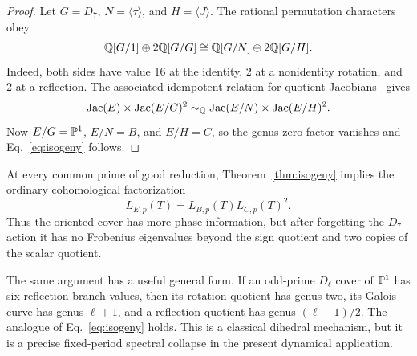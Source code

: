 \begin{proof}
Let $G=D_7$, $N=\langle\tau\rangle$, and $H=\langle J\rangle$.  The rational
permutation characters obey
\begin{equation}\label{eq:brauer}
 \mathbb Q[G/1]\oplus2\mathbb Q[G/G]
 \cong \mathbb Q[G/N]\oplus2\mathbb Q[G/H].
\end{equation}
Indeed, both sides have value 16 at the identity, 2 at a nonidentity rotation,
and 2 at a reflection.  The associated idempotent relation for quotient
Jacobians~\cite{kani1989idempotent} gives
\[
 \operatorname{Jac}(E)\times\operatorname{Jac}(E/G)^2
 \sim_\mathbb Q \operatorname{Jac}(E/N)\times\operatorname{Jac}(E/H)^2.
\]
Now $E/G=\mathbb P^1$, $E/N=B$, and $E/H=C$, so the genus-zero factor vanishes and
Eq.~\eqref{eq:isogeny} follows.
\end{proof}

At every common prime of good reduction, Theorem~\ref{thm:isogeny} implies
the ordinary cohomological factorization
\begin{equation}\label{eq:local-product}
 L_{E,p}(T)=L_{B,p}(T)L_{C,p}(T)^2.
\end{equation}
Thus the oriented cover has more phase information, but after forgetting the
$D_7$ action it has no Frobenius eigenvalues beyond the sign quotient and two
copies of the scalar quotient.

The same argument has a useful general form.  If an odd-prime $D_\ell$ cover
of $\mathbb P^1$ has six reflection branch values, then its rotation quotient has
genus two, its Galois curve has genus $\ell+1$, and a reflection quotient has
genus $(\ell-1)/2$.  The analogue of Eq.~\eqref{eq:isogeny} holds.  This is a
classical dihedral mechanism, but it is a precise fixed-period spectral
collapse in the present dynamical application.
